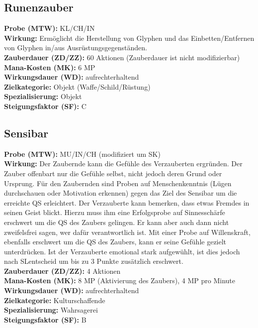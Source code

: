\subsection{Runenzauber}
\label{chap:runenzauber}
\textbf{Probe (MTW):} KL/CH/IN \\
\textbf{Wirkung:} Ermöglicht die Herstellung von Glyphen und das Einbetten/Entfernen von Glyphen in/aus Ausrüstungsgegenständen. \\
\textbf{Zauberdauer (ZD/ZZ):} 60 Aktionen (Zauberdauer ist nicht modifizierbar) \\
\textbf{Mana-Kosten (MK):} 6 MP \\
\textbf{Wirkungsdauer (WD):} aufrechterhaltend \\
\textbf{Zielkategorie:} Objekt (Waffe/Schild/Rüstung) \\
\textbf{Spezialisierung:} Objekt \\
\textbf{Steigungsfaktor (SF):} C


\subsection{Sensibar}
\label{chap:sensibar}
\textbf{Probe (MTW):} MU/IN/CH (modifiziert um SK) \\
\textbf{Wirkung:} Der Zaubernde kann die Gefühle des Verzauberten ergründen. Der Zauber offenbart nur die Gefühle selbst, nicht jedoch deren Grund oder Ursprung. Für den Zaubernden sind Proben auf Menschenkenntnis (Lügen durchschauen oder Motivation erkennen) gegen das Ziel des Sensibar um die erreichte QS erleichtert. Der Verzauberte kann bemerken, dass etwas Fremdes in seinen Geist blickt. Hierzu muss ihm eine Erfolgsprobe auf Sinnesschärfe erschwert um die QS des Zaubers gelingen. Er kann aber auch dann nicht zweifelsfrei sagen, wer dafür verantwortlich ist. Mit einer Probe auf Willenskraft, ebenfalls erschwert um die QS des Zaubers, kann er seine Gefühle gezielt unterdrücken. Ist der Verzauberte emotional stark aufgewühlt, ist dies jedoch nach SLentscheid um bis zu 3 Punkte zusätzlich erschwert. \\
\textbf{Zauberdauer (ZD/ZZ):} 4 Aktionen \\
\textbf{Mana-Kosten (MK):} 8 MP (Aktivierung des Zaubers), 4 MP pro Minute \\
\textbf{Wirkungsdauer (WD):} aufrechterhaltend \\
\textbf{Zielkategorie:} Kulturschaffende \\
\textbf{Spezialisierung:} Wahrsagerei \\
\textbf{Steigungsfaktor (SF):} B


